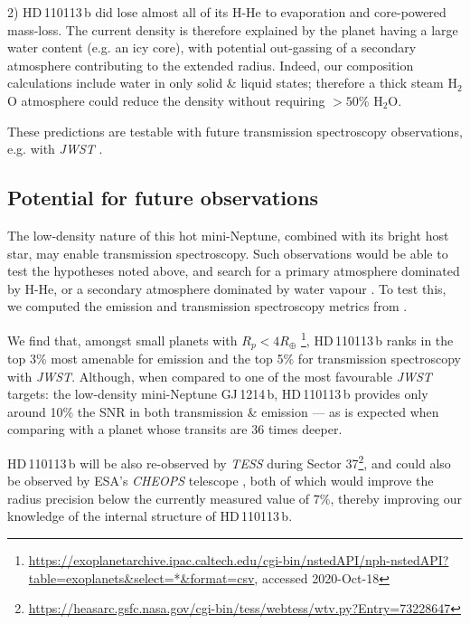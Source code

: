 \documentclass[fleqn,usenatbib]{mnras}
\newcommand{\tess}{{\it TESS}}
\newcommand{\Tplanet}{HD\,110113\,b}
\begin{document}
2) \Tplanet{} did lose almost all of its H-He to evaporation and core-powered mass-loss.
The current density is therefore explained by the planet having a large water content (e.g. an icy core), with potential out-gassing of a secondary atmosphere contributing to the extended radius.
Indeed, our composition calculations include water in only solid \& liquid states; therefore a thick steam \citep[or supercritical;][]{mousis2020irradiated} H$_{2}$O atmosphere could reduce the density without requiring $>50\%$ H$_{2}$O.

These predictions are testable with future transmission spectroscopy observations, e.g. with \textit{JWST} \citep{2016ApJ...817...17G,2014PASP..126.1134B}.

\subsection{Potential for future observations}\label{sect:future}
The low-density nature of this hot mini-Neptune, combined with its bright host star, may enable transmission spectroscopy.
Such observations would be able to test the hypotheses noted above, and search for a primary atmosphere dominated by H-He, or a secondary atmosphere dominated by water vapour \citep{2020arXiv201011867B}.
To test this, we computed the emission and transmission spectroscopy metrics from \citet{kempton2018framework}.

We find that, amongst small planets with $R_p<4R_\oplus$ \citep{akeson2013nasa}\footnote{\url{https://exoplanetarchive.ipac.caltech.edu/cgi-bin/nstedAPI/nph-nstedAPI?table=exoplanets&select=*&format=csv}, accessed 2020-Oct-18}, \Tplanet{} ranks in the top 3\% most amenable for emission and the top 5\% for transmission spectroscopy with \textit{JWST}.
Although, when compared to one of the most favourable \textit{JWST} targets: the low-density mini-Neptune GJ\,1214\,b, \Tplanet{} provides only around 10\% the SNR in both transmission \& emission --- as is expected when comparing with a planet whose transits are 36 times deeper.

\Tplanet{} will be also re-observed by \tess{} during Sector 37\footnote{\url{https://heasarc.gsfc.nasa.gov/cgi-bin/tess/webtess/wtv.py?Entry=73228647}}, and could also be observed by ESA's \textit{CHEOPS} telescope \citep{benz2020cheops}, both of which would improve the radius precision below the currently measured value of 7\%, thereby improving our knowledge of the internal structure of \Tplanet{}.
\end{document}
